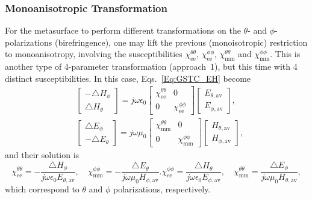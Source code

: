 \documentclass[journal,transaction]{IEEEtran}
\begin{document}
\subsubsection{Monoanisotropic Transformation}\label{sec:monoanis_transf}

For the metasurface to perform different transformations on the $\theta$- and $\phi$-polarizations (birefringence), one may lift the previous (monoisotropic) restriction to monoanisotropy, involving the susceptibilities $\chi^{\theta \theta}_\text{ee}$, $\chi^{\phi\phi}_\text{ee}$, $\chi^{\theta \theta}_\text{mm}$ and $\chi^{\phi\phi}_\text{mm}$. This is another type of 4-parameter transformation (approach~1), but this time with 4 distinct susceptibilities. In this case, Eqs.~\eqref{Eq:GSTC_EH} become
%
\begin{subequations}\label{Eq:matrix_mino_ani}
\begin{align}
     &\begin{bmatrix}
   -\triangle H_\phi  \\
   \triangle H_\theta
  \end{bmatrix}=j\omega\epsilon_0 \begin{bmatrix}
 \chi^{\theta\theta}_\text{ee}&0\\
0&\chi^{\phi \phi}_\text{ee}
  \end{bmatrix}\begin{bmatrix}
   E_{\theta,\text{av}} \\
   E_{\phi,\text{av}}
  \end{bmatrix},\\
     &\begin{bmatrix}
   \triangle E_\phi  \\
   -\triangle E_\theta
  \end{bmatrix}=j\omega\mu_0 \begin{bmatrix}
\chi^{\theta \theta}_\text{mm}&0\\
0&\chi^{\phi \phi}_\text{mm}
  \end{bmatrix}\begin{bmatrix}
   H_{\theta,\text{av}}  \\
   H_{\phi,\text{av}}
  \end{bmatrix},
\end{align}
\end{subequations}
%
and their solution is
%
\begin{subequations}\label{GSTC_X_e}
  \begin{equation}
  \chi^{\theta \theta}_\text{ee} =-\frac{\triangle H_\phi}{j\omega\epsilon_0 E_{\theta,\text{av}}}, \quad
  \chi^{\phi\phi}_\text{mm} =-\frac{\triangle E_\theta}{j\omega\mu_0 H_{\phi,\text{av}}}.
\end{equation}
  \begin{equation}
  \chi^{\phi\phi}_\text{ee} =\frac{\triangle H_\theta}{j\omega\epsilon_0 E_{\phi,\text{av}}},\quad
  \chi^{\theta \theta}_\text{mm} =\frac{\triangle E_\phi}{j\omega\mu_0 H_{\theta,\text{av}}},
\end{equation}
\end{subequations}
%
which correspond to $\theta$ and $\phi$ polarizations, respectively.
\end{document}
